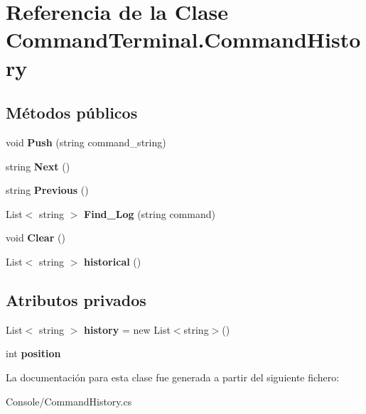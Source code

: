 \hypertarget{class_command_terminal_1_1_command_history}{}\section{Referencia de la Clase Command\+Terminal.\+Command\+History}
\label{class_command_terminal_1_1_command_history}
\subsection*{Métodos públicos}
\begin{DoxyCompactItemize}
\item 
\mbox{\label{class_command_terminal_1_1_command_history_a468cb902b41754b3e754e87b64604dd8}} 
void {\bfseries Push} (string command\+\_\+string)
\item 
\mbox{\label{class_command_terminal_1_1_command_history_a327941f014bc3b59b59a0aab9fbd41c8}} 
string {\bfseries Next} ()
\item 
\mbox{\label{class_command_terminal_1_1_command_history_a96c5dbea923ca72fd0e2f400baa681c4}} 
string {\bfseries Previous} ()
\item 
\mbox{\label{class_command_terminal_1_1_command_history_a9f0757ec1ef09815cbd8c2e66a1dcf5c}} 
List$<$ string $>$ {\bfseries Find\+\_\+\+Log} (string command)
\item 
\mbox{\label{class_command_terminal_1_1_command_history_a5882c8ea71e4799986a8aea0cf4fd1e7}} 
void {\bfseries Clear} ()
\item 
\mbox{\label{class_command_terminal_1_1_command_history_aa67f82a3aacf47ce9396178fac60dd40}} 
List$<$ string $>$ {\bfseries historical} ()
\end{DoxyCompactItemize}
\subsection*{Atributos privados}
\begin{DoxyCompactItemize}
\item 
\mbox{\label{class_command_terminal_1_1_command_history_aab1e1ba7805ed628f2ad525f20caa880}} 
List$<$ string $>$ {\bfseries history} = new List$<$string$>$()
\item 
\mbox{\label{class_command_terminal_1_1_command_history_ad48d62138b533a906b979c538b1b89cb}} 
int {\bfseries position}
\end{DoxyCompactItemize}


La documentación para esta clase fue generada a partir del siguiente fichero\+:\begin{DoxyCompactItemize}
\item 
Console/Command\+History.\+cs\end{DoxyCompactItemize}
